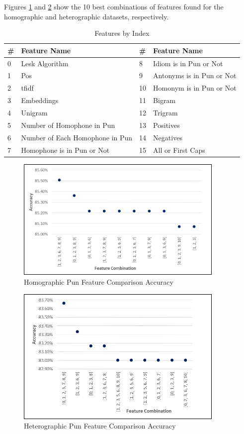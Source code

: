 \documentclass{article}
\begin{document}
Figures \ref{fig:ACC_Test_Homo} and \ref{fig:ACC_Test_Hetero} show the 10 best
combinations of features found for the homographic and heterographic datasets,
respectively.

\begin{table}
\caption{Features by Index}\label{tab:List_of_features} 
\begin{center}
\begin{tabular}{l l l l} 
\toprule
\textbf{\#} &\textbf{Feature Name}		& \textbf{\#} &	\textbf{Feature Name}\\
\midrule
0	&	Lesk Algorithm					& 8		&	Idiom is in Pun or Not\\
1	&	Pos								& 9		&	Antonyms is in Pun or Not\\
2	&	tfidf							& 10	&	Homonym is in Pun or Not\\
3	&	Embeddings						& 11	&	Bigram\\
4	&	Unigram							& 12	&	Trigram\\
5	&	Number of Homophone in Pun		& 13	&	Positives\\
6	&	Number of Each Homophone in Pun & 14	&	Negatives\\
7	&	Homophone is in Pun or Not		& 15	&	All or First Caps\\
\bottomrule
\end{tabular}
\end{center}
\end{table}

\begin{figure}
  \centering
  \includegraphics[width=10cm]{figures/Accuracy_on_Test_Set_for_Homographic_Pun.png}
  \caption{Homographic Pun Feature Comparison Accuracy}\label{fig:ACC_Test_Homo}
\end{figure}

\begin{figure}
  \centering
  \includegraphics[width=10cm]{figures/Accuracy_on_Test_Set_for_Heterographic_Pun.png}
  \caption{Heterographic Pun Feature Comparison Accuracy}\label{fig:ACC_Test_Hetero}
\end{figure}
\end{document}
